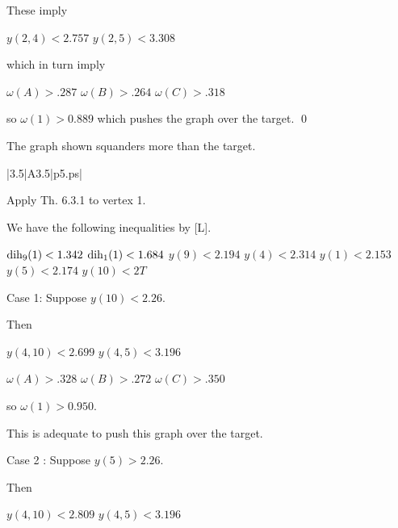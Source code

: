 These imply 

$y(2,4)<2.757$ \newline
$y(2,5)<3.308$ \newline

which in turn imply

$\omega(A)>.287$ \newline
$\omega(B)>.264$ \newline
$\omega(C)>.318$ \newline

so $\omega(1)>0.889$ which pushes the graph over the target. \qed



\bigskip



 The graph shown 
squanders more than the target.  \endproclaim

\gram|3.5|A3.5|p5.ps|  %

Apply Th. 6.3.1 to vertex 1.

We have the following inequalities by [L].

$\operatorname{dih}_9(1) < 1.342$ \newline
$\operatorname{dih}_1(1) < 1.684$ \newline
$y(9)<2.194$ \newline
$y(4)<2.314$ \newline
$y(1)<2.153$ \newline
$y(5)<2.174$ \newline
$y(10)<2T$ \newline


Case 1: Suppose $y(10)<2.26$.

Then 

$y(4,10)<2.699$ \newline
$y(4,5)<3.196$ \newline

$\omega(A)>.328$ \newline
$\omega(B)>.272$ \newline
$\omega(C)>.350$ \newline

so $\omega(1)>0.950$.  

This is adequate to push this graph over the target.

Case 2 : Suppose $y(5)>2.26$.

Then

$y(4,10)<2.809$ \newline
$y(4,5)<3.196$ \newline


